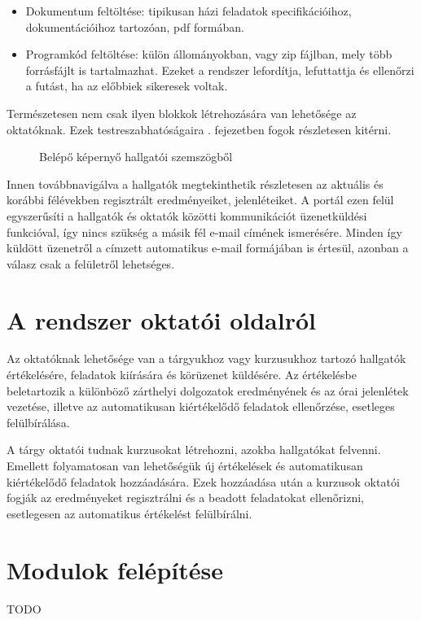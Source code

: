     \begin{itemize}
        \item Dokumentum feltöltése: tipikusan házi feladatok specifikációihoz, dokumentációihoz tartozóan, pdf formában.
        \item Programkód feltöltése: külön állományokban, vagy zip fájlban, mely több forrásfájlt is tartalmazhat. Ezeket a rendszer lefordítja, lefuttattja és ellenőrzi a futást, ha az előbbiek sikeresek voltak.
    \end{itemize}

    Természetesen nem csak ilyen blokkok létrehozására van lehetősége az oktatóknak. Ezek testreszabhatóságaira . fejezetben fogok részletesen kitérni.
    
    \begin{figure}[h]
        \centering
        \caption{Belépő képernyő hallgatói szemszögből}
        \label{fig:jporta_home}
    \end{figure}

    Innen továbbnavigálva a hallgatók megtekinthetik részletesen az aktuális és korábbi félévekben regisztrált eredményeiket, jelenléteiket. A portál ezen felül egyszerűsíti a hallgatók és oktatók közötti kommunikációt üzenetküldési funkcióval, így nincs szükség a másik fél e-mail címének ismerésére. Minden így küldött üzenetről a címzett automatikus e-mail formájában is értesül, azonban a válasz csak a felületről lehetséges.
 
\section{A rendszer oktatói oldalról}\label{section:teacher}
    Az oktatóknak lehetősége van a tárgyukhoz vagy kurzusukhoz tartozó hallgatók értékelésére, feladatok kiírására és körüzenet küldésére. Az értékelésbe beletartozik a különböző zárthelyi dolgozatok eredményének és az órai jelenlétek vezetése, illetve az automatikusan kiértékelődő feladatok ellenőrzése, esetleges felülbírálása.

    A tárgy oktatói tudnak kurzusokat létrehozni, azokba hallgatókat felvenni. Emellett folyamatosan van lehetőségük új értékelések és automatikusan kiértékelődő feladatok hozzáadására. Ezek hozzáadása után a kurzusok oktatói fogják az eredményeket regisztrálni és a beadott feladatokat ellenőrizni, esetlegesen az automatikus értékelést felülbírálni.

\section{Modulok felépítése}
TODO